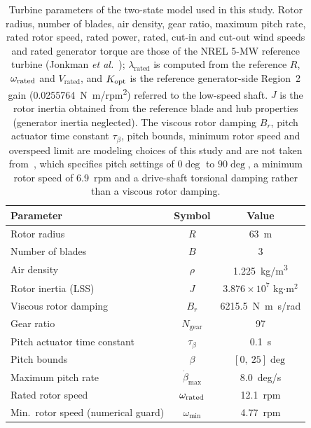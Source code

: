 \begin{table}[H]
\centering
\caption{{\color{auditP2}Turbine parameters of the two-state model used in this study.
Rotor radius, number of blades, air density, gear ratio, maximum pitch rate,
rated rotor speed, rated power, rated, cut-in and cut-out wind speeds and
rated generator torque are those of the NREL 5-MW reference turbine
(Jonkman \emph{et al.}~\cite{jonkman2009}); $\lambda_{\text{rated}}$ is
computed from the reference $R$, $\omega_{\text{rated}}$ and $V_{\text{rated}}$, and
$K_{\text{opt}}$ is the reference generator-side Region~2 gain
(\SI{0.0255764}{N.m/rpm^2}) referred to the low-speed shaft. $J$ is the rotor
inertia obtained from the reference blade and hub properties (generator
inertia neglected). The viscous rotor damping $B_r$, pitch actuator time
constant $\tau_\beta$, pitch bounds, minimum rotor speed and overspeed limit
are modeling choices of this study and are not taken from~\cite{jonkman2009},
which specifies pitch settings of $0\deg$ to $90\deg$, a minimum rotor speed
of \SI{6.9}{rpm} and a drive-shaft torsional damping rather than a viscous
rotor damping.}}
\label{tab:turbine_params}
\begin{tabular}{lcc}
\toprule
Parameter & Symbol & Value \\
\midrule
Rotor radius              & $R$                 & \SI{63}{m} \\
Number of blades          & $B$                 & 3 \\
Air density                & $\rho$              & \SI{1.225}{kg/m^3} \\
{\color{auditP2}Rotor inertia (LSS)}        & {\color{auditP2}$J$}                 & $3.876\times10^{7}$ kg$\cdot$m$^2$ \\
{\color{auditP2}Viscous rotor damping}      & {\color{auditP2}$B_r$}               & \SI{6215.5}{N.m.s/rad} \\
Gear ratio                 & $N_{\text{gear}}$   & 97 \\
Pitch actuator time constant & $\tau_\beta$      & \SI{0.1}{s} \\
Pitch bounds                & $\beta$             & $[0,\ 25]\deg$ \\
Maximum pitch rate          & $\dot\beta_{\max}$  & \SI{8.0}{deg/s} \\
Rated rotor speed          & $\omega_{\text{rated}}$       & \SI{12.1}{rpm} \\
{\color{auditP2}Min.\ rotor speed (numerical guard)} & {\color{auditP2}$\omega_{\min}$}     & \SI{4.77}{rpm} \\

\end{tabular}
\end{table}
